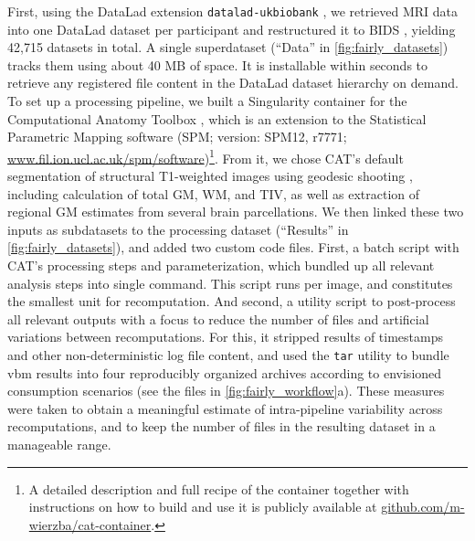 First, using the DataLad extension \texttt{datalad-ukbiobank} \citep{hanke_michael_2022_7296550}, we retrieved MRI data into one DataLad dataset per participant and restructured it to BIDS \citep{gorgolewski2016brain}, yielding 42,715 datasets in total.
A single superdataset (``Data'' in \cref{fig:fairly_datasets}) tracks them using about 40 MB of space.
It is installable within seconds to retrieve any registered file content in the DataLad dataset hierarchy on demand.\\
To set up a processing pipeline, we built a Singularity container for the Computational Anatomy Toolbox \citep[CAT; version: CAT12.7-RC2, r1720]{gaser}, which is an extension to the Statistical Parametric Mapping software (SPM; version: SPM12, r7771; \url{www.fil.ion.ucl.ac.uk/spm/software})\footnote{A detailed description and full recipe of the container together with instructions on how to build and use it is publicly available at \url{github.com/m-wierzba/cat-container}.}.
From it, we chose \gls{CAT}'s default segmentation of structural T1-weighted images using geodesic shooting \citep{ashburner2011diffeomorphic}, including calculation of total \gls{GM}, \gls{WM}, and \gls{TIV}, as well as extraction of regional \gls{GM} estimates from several brain parcellations.
We then linked these two inputs as subdatasets to the processing dataset (``Results'' in \cref{fig:fairly_datasets}), and added two custom code files.
First, a batch script with \gls{CAT}'s processing steps and parameterization, which bundled up all relevant analysis steps into single command.
This script runs per image, and constitutes the smallest unit for recomputation.
And second, a utility script to post-process all relevant outputs with a focus to reduce the number of files and artificial variations between recomputations.
For this, it stripped results of timestamps and other non-deterministic log file content, and used the \texttt{tar} utility to bundle \gls{vbm} results into four reproducibly organized archives according to envisioned consumption scenarios (see the files in \cref{fig:fairly_workflow}a).
These measures were taken to obtain a meaningful estimate of intra-pipeline variability across recomputations, and to keep the number of files in the resulting dataset in a manageable range.\\
